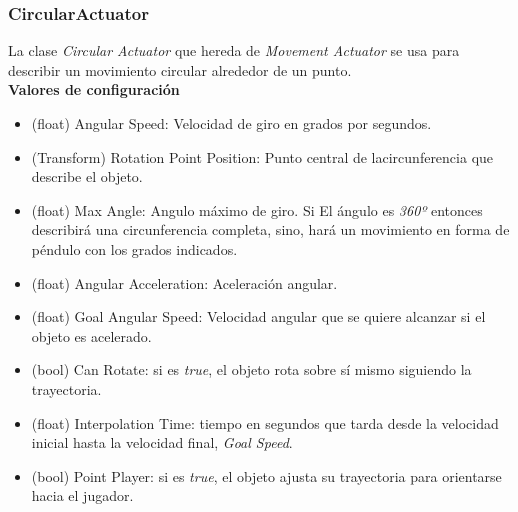 \subsubsection{CircularActuator}
La clase \textit{Circular Actuator} que hereda de \textit{Movement Actuator} se usa para describir un movimiento circular alrededor de un punto.\\
\textbf{Valores de configuración}
\begin{itemize}
	\item (float) Angular Speed: Velocidad de giro en grados por segundos.
	\item (Transform) Rotation Point Position: Punto central de lacircunferencia  que describe el objeto.
	\item (float) Max Angle: Angulo máximo de giro. Si El ángulo es \textit{360º} entonces describirá una circunferencia completa, sino, hará un movimiento en forma de péndulo con los grados indicados. 
	\item (float) Angular Acceleration: Aceleración angular.
	\item (float) Goal Angular Speed: Velocidad angular que se quiere alcanzar si el objeto es acelerado.
	\item (bool) Can Rotate: si es \textit{true}, el objeto rota sobre sí mismo siguiendo la trayectoria.
	\item (float) Interpolation Time: tiempo en segundos que tarda desde la velocidad inicial hasta la velocidad final, \textit{Goal Speed}.
	\item (bool) Point Player: si es \textit{true}, el objeto ajusta su trayectoria para orientarse hacia el jugador.

\end{itemize}

